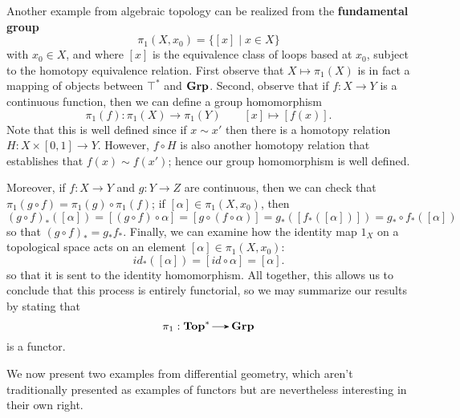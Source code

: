     \begin{example}\label{example:fundamental_group}
        Another example from algebraic topology can be
        realized from the \textbf{fundamental group}
        \[
            \pi_1(X, x_0) = \{[x] \mid x \in X\}
        \] 
        with $x_0 \in X$, and 
        where $[x]$ is the equivalence class of loops based at $x_0$, subject 
        to the homotopy equivalence 
        relation. First observe that $X \mapsto \pi_1(X)$ is in fact a mapping 
        of objects between $\top^*$ and $\operatorname{\mathbf{Grp}}$. Second, 
        observe that if $f: X \to Y$ is a continuous function, then 
        we can define a group homomorphism 
        \[
            \pi_1(f): \pi_1(X) \to \pi_1(Y) \qquad [x] \mapsto [f(x)].
        \]
        Note that this is well defined since if $x \sim x'$ then 
        there is a homotopy relation $H: X \times [0, 1] \to Y$. However, 
        $f \circ H$ is also another homotopy relation that establishes that 
        $f(x) \sim f(x')$; hence our group homomorphism is well defined. 
        
        Moreover, if $f: X \to Y$ and $g:Y \to Z$ are continuous, then 
        we can check that $\pi_1(g \circ f) = \pi_1(g) \circ \pi_1(f)$;
        if $[\alpha] \in \pi_1(X, x_0)$,
        then
        \[
            (g \circ f)_*([\alpha]) = [(g \circ f) \circ \alpha] 
            = [g \circ (f \circ \alpha)]
            = g_*([f_*([\alpha])]) = g_* \circ f_*([\alpha]) 
        \]
        so that $(g \circ f)_* = g_*f_*$. Finally, we 
        can examine how the identity map $1_X$ on a topological 
        space acts on an element $[\alpha] \in \pi_1(X, x_0)$:
        \[
            id_*([\alpha]) = [id \circ \alpha] = [\alpha].
        \]
        so that it is sent to the identity homomorphism. All together, this allows 
        us to conclude that this process is entirely functorial, so we may summarize our 
        results by stating that 
        \[
            \pi_1: \top^* \to \grp   
        \]
        is a functor.
    \end{example}

    We now present two examples from differential geometry, which aren't traditionally 
    presented as examples of functors but are nevertheless interesting in their 
    own right. 
    \vspace{0.5cm}

